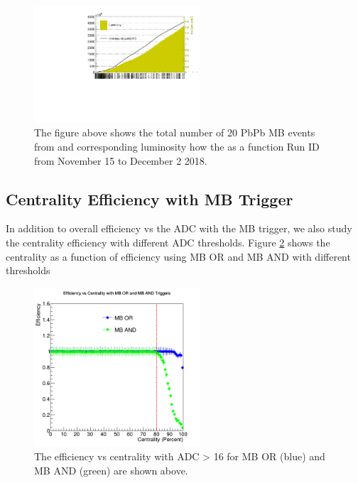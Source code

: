 \begin{figure}[hbtp]
\begin{center}
\includegraphics[width=0.55\textwidth]{Figures/Chapter2/MBStat.pdf}
\caption{The figure above shows the total number of 20 PbPb MB events from and corresponding luminosity how the as a function Run ID from November 15 to December 2 2018.}
\label{MBStat}
\end{center}
\end{figure} 


\subsection{Centrality Efficiency with MB Trigger}

In addition to overall efficiency vs the ADC with the MB trigger, we also study the centrality efficiency with different ADC thresholds. Figure \ref{EffCent} shows the centrality as a function of efficiency using MB OR and MB AND with different thresholds

\begin{figure}[hbtp]
\begin{center}
\includegraphics[width=0.55\textwidth]{Figures/Chapter2/EffCent.png}
\caption{The efficiency vs centrality with ADC > 16 for MB OR (blue) and MB AND (green) are shown above.}
\label{EffCent}
\end{center}
\end{figure} 

